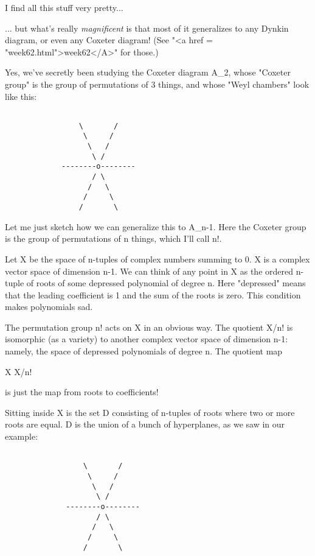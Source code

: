 I find all this stuff very pretty...

... but what's really \emph{magnificent} is that most of it
generalizes to any Dynkin diagram, or even any Coxeter diagram!  (See
"<a href = "week62.html">week62</A>" for those.)

Yes, we've secretly been studying the Coxeter diagram A_{2}, whose 
"Coxeter group" is the group of permutations of 3 things, and whose 
"Weyl chambers" look like this:

                         

\begin{verbatim}

                 \       /
                  \     /
                   \   /
                    \ /
             --------o--------
                    / \
                   /   \
                  /     \
                 /       \
\end{verbatim}
    
Let me just sketch how we can generalize this to A_{n-1}.   Here 
the Coxeter group is the group of permutations of n things, which
I'll call n!.

Let X be the space of n-tuples of complex numbers summing to 0.  
X is a complex vector space of dimension n-1.  We can think of
any point in X as the ordered n-tuple of roots of some depressed polynomial
of degree n.  Here "depressed" means that the leading coefficient 
is 1 and the sum of the roots is zero.  This condition makes polynomials
sad.

The permutation group n! acts on X in an obvious way.  The 
quotient X/n! is isomorphic (as a variety) to another complex 
vector space of dimension n-1: namely, the space of depressed 
polynomials of degree n.  The quotient map

X \to  X/n!

is just the map from roots to coefficients!  

Sitting inside X is the set D consisting of n-tuples of roots
where two or more roots are equal.  D is the union of a bunch of hyperplanes,
as we saw in our example:

                         

\begin{verbatim}

                  \       /
                   \     /
                    \   /
                     \ /
              --------o--------
                     / \
                    /   \
                   /     \
                  /       \
\end{verbatim}
    

